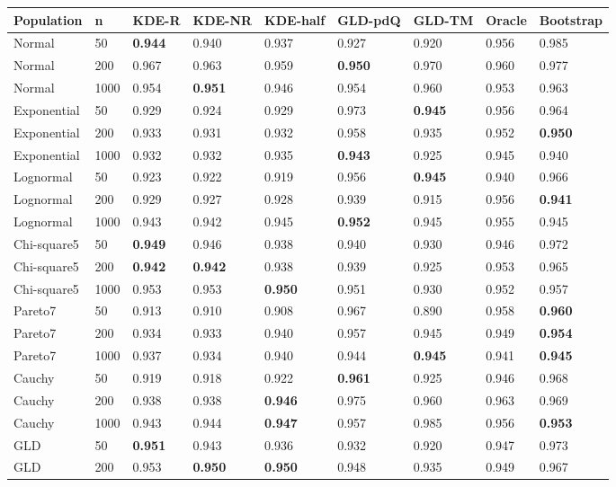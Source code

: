 \begin{tabular}{lllllllll}
\toprule
Population & n & KDE-R & KDE-NR & KDE-half & GLD-pdQ & GLD-TM & Oracle & Bootstrap \\
\midrule
Normal & 50 & \textbf{0.944} & 0.940 & 0.937 & 0.927 & 0.920 & 0.956 & 0.985 \\
Normal & 200 & 0.967 & 0.963 & 0.959 & \textbf{0.950} & 0.970 & 0.960 & 0.977 \\
Normal & 1000 & 0.954 & \textbf{0.951} & 0.946 & 0.954 & 0.960 & 0.953 & 0.963 \\
Exponential & 50 & 0.929 & 0.924 & 0.929 & 0.973 & \textbf{0.945} & 0.956 & 0.964 \\
Exponential & 200 & 0.933 & 0.931 & 0.932 & 0.958 & 0.935 & 0.952 & \textbf{0.950} \\
Exponential & 1000 & 0.932 & 0.932 & 0.935 & \textbf{0.943} & 0.925 & 0.945 & 0.940 \\
Lognormal & 50 & 0.923 & 0.922 & 0.919 & 0.956 & \textbf{0.945} & 0.940 & 0.966 \\
Lognormal & 200 & 0.929 & 0.927 & 0.928 & 0.939 & 0.915 & 0.956 & \textbf{0.941} \\
Lognormal & 1000 & 0.943 & 0.942 & 0.945 & \textbf{0.952} & 0.945 & 0.955 & 0.945 \\
Chi-square5 & 50 & \textbf{0.949} & 0.946 & 0.938 & 0.940 & 0.930 & 0.946 & 0.972 \\
Chi-square5 & 200 & \textbf{0.942} & \textbf{0.942} & 0.938 & 0.939 & 0.925 & 0.953 & 0.965 \\
Chi-square5 & 1000 & 0.953 & 0.953 & \textbf{0.950} & 0.951 & 0.930 & 0.952 & 0.957 \\
Pareto7 & 50 & 0.913 & 0.910 & 0.908 & 0.967 & 0.890 & 0.958 & \textbf{0.960} \\
Pareto7 & 200 & 0.934 & 0.933 & 0.940 & 0.957 & 0.945 & 0.949 & \textbf{0.954} \\
Pareto7 & 1000 & 0.937 & 0.934 & 0.940 & 0.944 & \textbf{0.945} & 0.941 & \textbf{0.945} \\
Cauchy & 50 & 0.919 & 0.918 & 0.922 & \textbf{0.961} & 0.925 & 0.946 & 0.968 \\
Cauchy & 200 & 0.938 & 0.938 & \textbf{0.946} & 0.975 & 0.960 & 0.963 & 0.969 \\
Cauchy & 1000 & 0.943 & 0.944 & \textbf{0.947} & 0.957 & 0.985 & 0.956 & \textbf{0.953} \\
GLD & 50 & \textbf{0.951} & 0.943 & 0.936 & 0.932 & 0.920 & 0.947 & 0.973 \\
GLD & 200 & 0.953 & \textbf{0.950} & \textbf{0.950} & 0.948 & 0.935 & 0.949 & 0.967 \\

\end{tabular}
